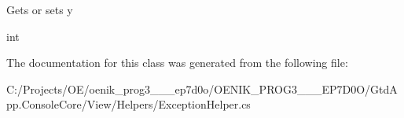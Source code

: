 Gets or sets y 

int

The documentation for this class was generated from the following file\+:\begin{DoxyCompactItemize}
\item 
C\+:/\+Projects/\+O\+E/oenik\+\_\+prog3\+\_\+\_\+\_\+ep7d0o/\+O\+E\+N\+I\+K\+\_\+\+P\+R\+O\+G3\+\_\+\_\+\_\+\+E\+P7\+D0\+O/\+Gtd\+App.\+Console\+Core/\+View/\+Helpers/Exception\+Helper.\+cs\end{DoxyCompactItemize}
